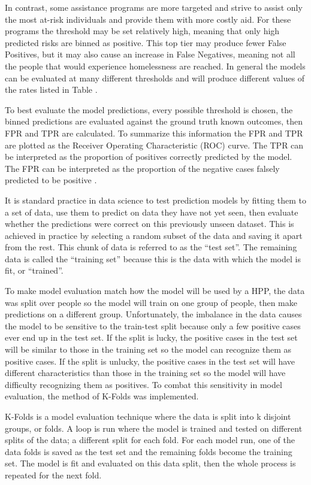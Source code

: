 \documentclass[10pt,letterpaper]{article}
\newcommand{\red}[1]{{\color{red}{#1}}}
\begin{document}
In contrast, some assistance programs are more targeted and strive to assist only the most at-risk individuals and provide them with more costly aid. For these programs the threshold may be set relatively high, meaning that only high predicted risks are binned as positive. This top tier may produce fewer False Positives, but it may also cause an increase in False Negatives, meaning not all the people that would experience homelessness are reached. In general the models can be evaluated at many different thresholds and will produce different values of the rates listed in Table \red{UPDATE}.

To best evaluate the model predictions, every possible threshold is chosen, the binned predictions are evaluated against the ground truth known outcomes, then FPR and TPR are calculated. To summarize this information the FPR and TPR are plotted as the Receiver Operating Characteristic (ROC) curve. The TPR can be interpreted as the proportion of positives correctly predicted by the model. The FPR can be interpreted as the proportion of the negative cases falsely predicted to be positive \cite{fawcett2006introduction}. 

It is standard practice in data science to test prediction models by fitting them to a set of data, use them to predict on data they have not yet seen, then evaluate whether the predictions were correct on this previously unseen dataset. This is achieved in practice by selecting a random subset of the data and saving it apart from the rest. This chunk of data is referred to as the ``test set''. The remaining data is called the ``training set'' because this is the data with which the model is fit, or ``trained''. 

To make model evaluation match how the model will be used by a HPP, the data was split over people so the model will train on one group of people, then make predictions on a different group. Unfortunately, the imbalance in the data causes the model to be sensitive to the train-test split because only a few positive cases ever end up in the test set. If the split is lucky, the positive cases in the test set will be similar to those in the training set so the model can recognize them as positive cases. If the split is unlucky, the positive cases in the test set will have different characteristics than those in the training set so the model will have difficulty recognizing them as positives. To combat this sensitivity in model evaluation, the method of K-Folds was implemented.

K-Folds is a model evaluation technique where the data is split into k disjoint groups, or folds. A loop is run where the model is trained and tested on different splits of the data; a different split for each fold. For each model run, one of the data folds is saved as the test set and the remaining folds become the training set. The model is fit and evaluated on this data split, then the whole process is repeated for the next fold.
\end{document}
